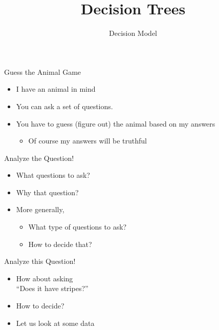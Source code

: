 \documentclass[aspectratio=169, 14pt]{beamer}
\title[Decision Trees]{Decision Trees}
\begin{document}
{\1
\begin{frame}
\subtitle{Decision Model}
\maketitle
\end{frame}
}

\begin{frame}{Guess the Animal Game}
\begin{itemize}
\item I have an animal in mind
\item You can ask a set of questions. 
\item You have to guess (figure out) the animal based on my answers
\begin{itemize}
\item Of course my answers will be truthful
\end{itemize}
\end{itemize}
\end{frame}

\begin{frame}{Analyze the Question!}
\begin{itemize}
\item What questions to ask?
\item Why that question? 
\item More generally,
\begin{itemize}
\item What type of questions to ask?
\item How to decide that?
\end{itemize}
\end{itemize}
\end{frame}

\begin{frame}{Analyze this Question!}
\begin{itemize}
\item How about asking \\
	\enquote{Does it have stripes?}
\item How to decide? 
\item Let us look at some data
\end{itemize}
\end{frame}
\end{document}
